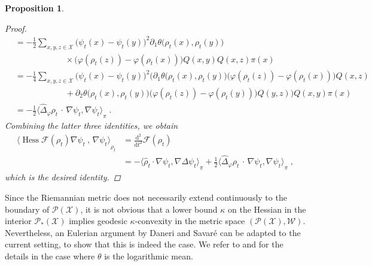 \documentclass[a4paper,11pt,reqno]{amsart}
\theoremstyle{plain}
\newtheorem{proposition}[theorem]{Proposition}
\theoremstyle{remark}
\numberwithin{equation}{section}
\begin{document}
\begin{proposition}
\begin{proof}
\begin{align*}
 & 
  =
   -\frac12
       \sum_{x,y,z \in {\mathcal{X}}}
         \big(\psi_t(x) - \psi_t(y)\big)^2 \partial_1 \theta\big(\rho_t(x), \rho_t(y)\big) 
\\& \qquad\qquad\qquad  \times         \big({\varphi}(\rho_t(z))  - {\varphi}(\rho_t(x))\big) Q(x,y) Q(x,z) \pi(x)
 \\&  =
   -\frac14
       \sum_{x,y,z \in {\mathcal{X}}}
         \big(\psi_t(x) - \psi_t(y)\big)^2 
        \Big( \partial_1 \theta\big(\rho_t(x), \rho_t(y)\big) \big({\varphi}(\rho_t(z)) - {\varphi}(\rho_t(x)) \big)Q(x,z)
 \\& \qquad\qquad\qquad
   + \partial_2 \theta\big(\rho_t(x), \rho_t(y)\big) \big({\varphi}(\rho_t(z)) - {\varphi}(\rho_t(y)) \big)Q(y,z)\Big)
       Q(x,y)  \pi(x)
 \\& = -\frac12 {\big\langle {{{\hat\Delta}_{\varphi}\rho_t\, \cdot\, \nabla \psi_t, \nabla \psi_t }}\big\rangle}_\pi\;.
\end{align*}
Combining the latter three identities, we obtain
\begin{align*}
{\big\langle {{ \operatorname{Hess} {\mathcal{F}}(\rho_t) \nabla \psi_t\ ,\, \nabla \psi_t}}\big\rangle}_{\rho_t}
  &= {\frac{\mathrm{d^2}}{\mathrm{d}t^2}} {\mathcal{F}}(\rho_t)
  \\&   = - {\big\langle {{  \hat\rho_t \cdot   \nabla \psi_t ,  \nabla\Delta \psi_t }}\big\rangle}_{\pi}
        +  \frac12 {\big\langle {{{\hat\Delta}_{\varphi}\rho_t\, \cdot\, \nabla \psi_t, \nabla \psi_t }}\big\rangle}_\pi\;,
\end{align*}
which is the desired identity.
\end{proof}
\end{proposition}

Since the Riemannian metric does not necessarily extend continuously to the
boundary of ${{\mathscr{P}}({\mathcal{X}})}$, it is not obvious that a lower bound $\kappa$ on
the Hessian in the interior ${{\mathscr{P}}_*({\mathcal{X}})}$ implies geodesic $\kappa$-convexity
in the metric space $({{\mathscr{P}}({\mathcal{X}})},{\mathcal{W}})$. Nevertheless, an Eulerian argument by
Daneri and Savar\'e \cite{DS08} can be adapted to the current setting,
to show that this is indeed the case. We refer to \cite[Theorem
4.5]{EM11} and \cite[Proposition 2.1]{Mie11b} for the details in the case where
$\theta$ is the logarithmic mean.
\end{document}
